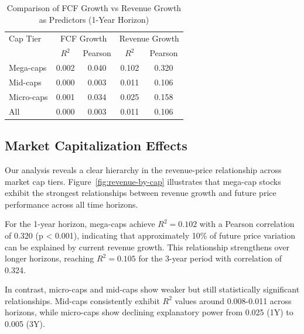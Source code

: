 \documentclass[11pt]{article}
\begin{document}
\begin{table}[!htbp]
\centering
\caption{Comparison of FCF Growth vs Revenue Growth as Predictors (1-Year Horizon)}
\label{tab:fcf-vs-revenue}
\begin{tabular}{lcccc}
\toprule
Cap Tier & \multicolumn{2}{c}{FCF Growth} & \multicolumn{2}{c}{Revenue Growth} \\
\cmidrule(r){2-3} \cmidrule(l){4-5}
 & $R^2$ & Pearson & $R^2$ & Pearson \\
\midrule
Mega-caps & 0.002 & 0.040 & 0.102 & 0.320 \\
Mid-caps  & 0.000 & 0.003 & 0.011 & 0.106 \\
Micro-caps & 0.001 & 0.034 & 0.025 & 0.158 \\
All & 0.000 & 0.003 & 0.011 & 0.106 \\
\bottomrule
\end{tabular}
\end{table}

\vspace{1em}
\FloatBarrier

\subsection{Market Capitalization Effects}

Our analysis reveals a clear hierarchy in the revenue-price relationship across market cap tiers. Figure~\ref{fig:revenue-by-cap} illustrates that mega-cap stocks exhibit the strongest relationships between revenue growth and future price performance across all time horizons.

For the 1-year horizon, mega-caps achieve $R^2 = 0.102$ with a Pearson correlation of 0.320 (p < 0.001), indicating that approximately 10\% of future price variation can be explained by current revenue growth. This relationship strengthens over longer horizons, reaching $R^2 = 0.105$ for the 3-year period with correlation of 0.324.

In contrast, micro-caps and mid-caps show weaker but still statistically significant relationships. Mid-caps consistently exhibit $R^2$ values around 0.008-0.011 across horizons, while micro-caps show declining explanatory power from 0.025 (1Y) to 0.005 (3Y).
\end{document}
